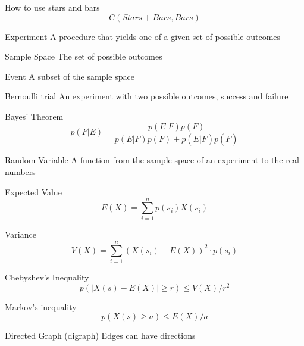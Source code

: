 \documentclass[grid,avery5371]{flashcards}
\begin{document}
\begin{flashcard}[]{How to use stars and bars}
	$$C(Stars+Bars,Bars)$$
\end{flashcard}

\begin{flashcard}[]{Experiment}
	A procedure that yields one of a given set of possible outcomes
\end{flashcard}

\begin{flashcard}[]{Sample Space}
	The set of possible outcomes
\end{flashcard}


\begin{flashcard}[]{Event}
	A subset of the sample space
\end{flashcard}

\begin{flashcard}[]{Bernoulli trial}
	An experiment with two possible outcomes, success and failure
\end{flashcard}

\begin{flashcard}[]{Bayes' Theorem}
	$$
	p(F | E)=\frac{p(E | F) p(F)}{p(E | F) p(F)+p(E | \overline{F}) p(\overline{F})}
	$$
\end{flashcard}

\begin{flashcard}[]{Random Variable}
	A function from the sample space of an experiment to the real numbers
\end{flashcard}

\begin{flashcard}[]{Expected Value}
	$$
	E(X)=\sum_{i=1}^{n} p\left(s_{i}\right) X\left(s_{i}\right)
	$$
\end{flashcard}

\begin{flashcard}[]{Variance}
	$$
	V(X)=\sum_{i=1}^{n}\left(X\left(s_{i}\right)-E(X)\right)^{2} \cdot p\left(s_{i}\right)
	$$
\end{flashcard}

\begin{flashcard}[]{Chebyshev's Inequality}
	\[
	p(|X(s)-E(X)| \geq r) \leq V(X) / r^{2}
	\]
\end{flashcard}

\begin{flashcard}[]{Markov's inequality}
	\[
	p(X(s) \geq a) \leq E(X) / a
	\]
\end{flashcard}

\begin{flashcard}[]{Directed Graph (digraph)}
	Edges can have directions
\end{flashcard}
\end{document}
